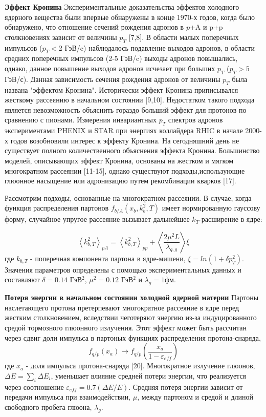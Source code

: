 \textbf{Эффект Кронина}
Экспериментальные доказательства эффектов холодного ядерного вещества были впервые обнаружены в конце 1970-х годов, когда было обнаружено, что отношение сечений рождения адронов в $p$+A и p+p столкновениях зависит от величины $p_T$ [7,8]. В области малых поперечных импульсов ($p_T < $2 ГэВ/c) наблюдалось подавление выходов адронов, в области средних поперечных импульсов (2-5 ГэВ/c) выходы адронов повышались, однако, данное повышение выходов адронов исчезает при больших $p_T$ ($p_T > 5$ ГэВ/с).
Данная зависимость сечения рождения адронов от величины $p_T$ была названа "эффектом Кронина". Исторически эффект Кронина приписывался жесткому рассеянию в начальном состоянии [9,10]. Недостатком такого подхода является невозможность  объяснить гораздо больший эффект для протонов по сравнению с пионами. Измерения инвариантных $p_T$ спектров адронов экспериментами PHENIX и STAR при энергиях коллайдера RHIC в начале 2000-х годов возобновили интерес к эффекту Кронина.  На сегодняшний день не существует полного количественного объяснения эффекта Кронина. Большинство моделей, описывающих эффект Кронина, основаны на жестком и мягком многократном рассеянии [11-15], однако существуют подходы,использующие глюонное насыщение или адронизацию путем рекомбинации кварков [17].

Рассмотрим подходы, основанные на многократном рассеянии.
В случае, когда функция распределения партонов $f_{b/A}(x_b, k_b^2, T)$ имеет нормированную гауссову форму, случайное упругое рассеяние вызывает дальнейшее $k_T$-расширение в ядре:

$$\left< k_{b,T}^2 \right>_{pA} = \left< k_{b,T}^2 \right>_{pp} + \left< \frac{2 \mu^2 L}{\lambda_{q,g}} \right> \xi $$
где $k_{b,T}$ - поперечная компонента партона в ядре-мишени, $\xi = ln(1+\delta p_T^2)$. Значения параметров определены с помощью экспериментальных данных и составляют $\delta = 0.14$ ГэВ$^2$, $\mu^2 = 0.12$ ГэВ$^2$ и $\lambda_g = 1$фм.

\textbf{Потеря энергии в начальном состоянии холодной ядерной материи}
Партоны наслетающего протона претерпевают многократное рассеяние в ядре перед жестким столкновением, вследствии чеготеряют энергию из-за индуцированного средой тормозного глюонного излучения. Этот эффект может быть рассчитан через сдвиг доли импульса в партоных функциях распределения протона-снаряда,
$$f_{q/p}(x_a) \rightarrow f_{q/p} \left( \frac{x_a}{1-\varepsilon_{eff}} \right)$$
где $x_a$ - доля импульса протона-снаряда [20]. Многократное излучение глюонов, $\Delta E = \sum_i \Delta E_i$, уменьшает влияние средней потери энергии, что реализуется через соотношение $\varepsilon_{eff}=0.7(\Delta E / E)$. Средняя потеря энергии зависит от передачи импульса при взаимодействии, $\mu$, между партоном и средой и длиной свободного пробега глюона, $\lambda_g$. 

